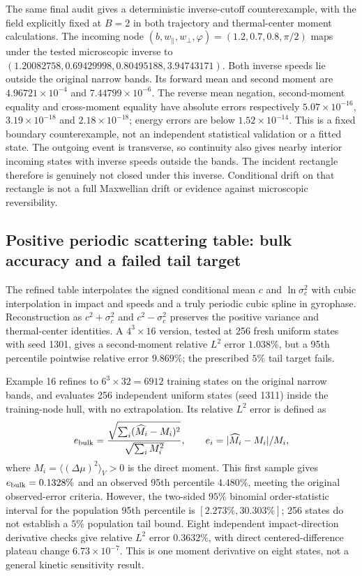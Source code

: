 \documentclass[11pt,letterpaper]{article}
\begin{document}
The same final audit gives a deterministic inverse-cutoff counterexample,
with the field explicitly fixed at $B=2$ in both trajectory and thermal-center
moment calculations. The incoming node
$(b,w_\parallel,w_\perp,\varphi)=(1.2,0.7,0.8,\pi/2)$ maps under the tested
microscopic inverse to
$(1.20082758,0.69429998,0.80495188,3.94743171)$.
Both inverse speeds lie outside the original narrow bands. Its forward
mean and second moment are $4.96721\times10^{-4}$ and
$7.44799\times10^{-6}$. The reverse mean negation, second-moment equality
and cross-moment equality have absolute errors respectively
$5.07\times10^{-16}$, $3.19\times10^{-18}$ and $2.18\times10^{-18}$;
energy errors are below $1.52\times10^{-14}$. This is a fixed boundary
counterexample, not an independent statistical validation or a fitted state.
The outgoing event is transverse, so continuity also gives nearby interior
incoming states with inverse speeds outside the bands. The incident rectangle
therefore is genuinely not closed under this inverse. Conditional drift on
that rectangle is not a full Maxwellian drift or evidence against microscopic
reversibility.

\subsection*{Positive periodic scattering table: bulk accuracy and a failed tail target}
The refined table interpolates the signed conditional mean $c$ and
$\ln\sigma_c^2$ with cubic interpolation in impact and speeds and a truly
periodic cubic spline in gyrophase. Reconstruction as
$c^2+\sigma_c^2$ and $c^2-\sigma_c^2$ preserves the positive variance and
thermal-center identities. A $4^3\times16$ version, tested at 256 fresh
uniform states with seed 1301, gives a second-moment relative $L^2$ error
$1.038\%$, but a 95th percentile pointwise relative error $9.869\%$;
the prescribed $5\%$ tail target fails.

Example 16 refines to $6^3\times32=6912$ training states on the original
narrow bands, and evaluates 256 independent uniform states (seed 1311)
inside the training-node hull, with no extrapolation. Its relative $L^2$
error is defined as
\begin{equation}
 e_{\rm bulk}=\frac{\sqrt{\sum_i(\widehat M_i-M_i)^2}}
                         {\sqrt{\sum_i M_i^2}},\qquad
 e_i=|\widehat M_i-M_i|/M_i,
\end{equation}
where $M_i=\langle(\Delta\mu)^2\rangle_V>0$ is the direct moment.
This first sample gives $e_{\rm bulk}=0.1328\%$ and an observed 95th
percentile $4.480\%$, meeting the original observed-error criteria. However,
the two-sided $95\%$ binomial order-statistic interval for the population
95th percentile is $[2.273\%,30.303\%]$; 256 states do not establish a
$5\%$ population tail bound. Eight independent impact-direction derivative
checks give relative $L^2$ error $0.3632\%$, with direct centered-difference
plateau change $6.73\times10^{-7}$. This is one moment derivative on eight
states, not a general kinetic sensitivity result.
\end{document}
